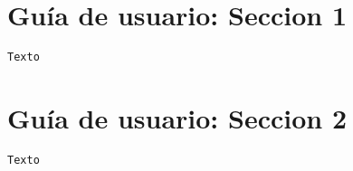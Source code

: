 \section{Gu\'ia de usuario: Seccion 1}
\label{Apendice2:label}

\begin{center}
\begin{footnotesize}

\begin{verbatim}
Texto
\end{verbatim}

\end{footnotesize}
\end{center}

\section{Gu\'ia de usuario: Seccion 2}
\label{Apendice2:label2}

\begin{center}
\begin{footnotesize}

\begin{verbatim}
Texto
\end{verbatim}


\end{footnotesize}
\end{center}
